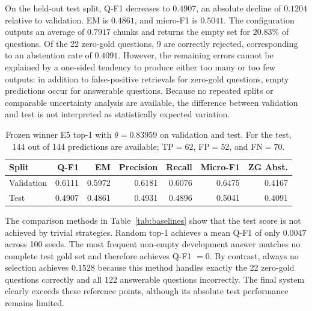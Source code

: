 \documentclass[11pt]{article}
\begin{document}
On the held-out test split, Q-F1 decreases to $0.4907$, an absolute decline of $0.1204$ relative to validation. EM is $0.4861$, and micro-F1 is $0.5041$. The configuration outputs an average of $0.7917$ chunks and returns the empty set for $20.83\%$ of questions. Of the 22 zero-gold questions, 9 are correctly rejected, corresponding to an abstention rate of $0.4091$. However, the remaining errors cannot be explained by a one-sided tendency to produce either too many or too few outputs: in addition to false-positive retrievals for zero-gold questions, empty predictions occur for answerable questions. Because no repeated splits or comparable uncertainty analysis are available, the difference between validation and test is not interpreted as statistically expected variation.

\begin{table}[t]
\centering
\small
\begin{tabular}{lrrrrrr}
\toprule
\textbf{Split} & \textbf{Q-F1} & \textbf{EM} & \textbf{Precision} & \textbf{Recall} & \textbf{Micro-F1} & \textbf{ZG Abst.} \\
\midrule
Validation & 0.6111 & 0.5972 & 0.6181 & 0.6076 & 0.6475 & 0.4167 \\
Test         & 0.4907 & 0.4861 & 0.4931 & 0.4896 & 0.5041 & 0.4091 \\
\bottomrule
\end{tabular}
\caption{Frozen winner E5 top-1 with $\theta=0.83959$ on validation and test. For the test, 144 out of 144 predictions are available; TP${}=62$, FP${}=52$, and FN${}=70$.}
\label{tab:final-system}
\end{table}

The comparison methods in Table~\ref{tab:baselines} show that the test score is not achieved by trivial strategies. Random top-1 achieves a mean Q-F1 of only $0.0047$ across 100 seeds. The most frequent non-empty development answer matches no complete test gold set and therefore achieves Q-F1 $=0$. By contrast, always no selection achieves $0.1528$ because this method handles exactly the 22 zero-gold questions correctly and all 122 answerable questions incorrectly. The final system clearly exceeds these reference points, although its absolute test performance remains limited.
\end{document}
